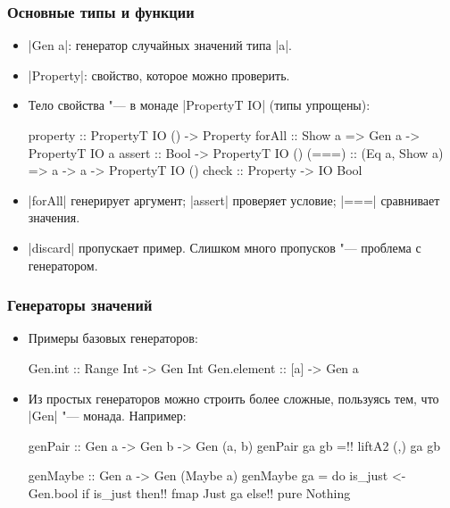 \documentclass[11pt]{beamer}
\begin{document}
\begin{frame}[fragile]
  \frametitle{Основные типы и функции}
  \begin{itemize}
    \item \haskinline|Gen a|: генератор случайных значений типа \haskinline|a|.
    \item \haskinline|Property|: свойство, которое можно проверить.
    \item Тело свойства "--- в монаде \haskinline|PropertyT IO| (типы упрощены):
          \begin{haskellsmall}
            property :: PropertyT IO () -> Property
            forAll :: Show a => Gen a -> PropertyT IO a
            assert :: Bool -> PropertyT IO ()
            (===) :: (Eq a, Show a) =>
                     a -> a -> PropertyT IO ()
            check :: Property -> IO Bool
          \end{haskellsmall}
    \item \haskinline|forAll| генерирует аргумент; \haskinline|assert| проверяет условие; \haskinline|===| сравнивает значения.
    \item \haskinline|discard| пропускает пример. Слишком много пропусков "--- проблема с генератором.
  \end{itemize}
\end{frame}

\begin{frame}[fragile]
  \frametitle{Генераторы значений}
  \begin{itemize}
    \item Примеры базовых генераторов:
          \begin{haskell}
            Gen.int :: Range Int -> Gen Int
            Gen.element :: [a] -> Gen a
          \end{haskell}
    \item Из простых генераторов можно строить более сложные, пользуясь тем, что \haskinline|Gen| "--- монада. Например:
          \begin{haskell}
            genPair :: Gen a -> Gen b -> Gen (a, b)
            genPair ga gb =!\pause! liftA2 (,) ga gb

            genMaybe :: Gen a -> Gen (Maybe a)
            genMaybe ga = do is_just <- Gen.bool
                            if is_just 
                              then!\pause! fmap Just ga
                              else!\pause! pure Nothing
          \end{haskell}
  \end{itemize}
\end{frame}
\end{document}
